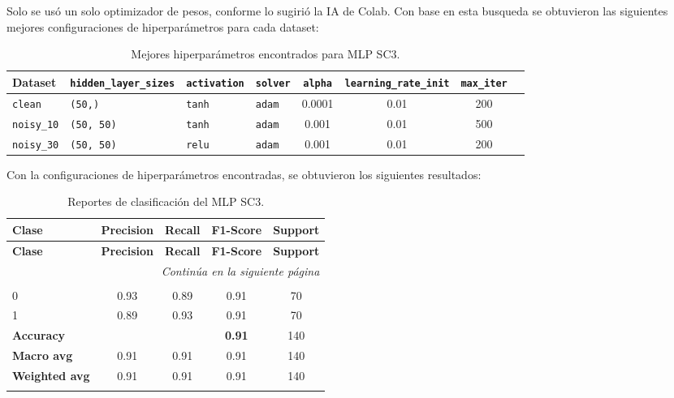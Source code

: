 \documentclass[12pt,a4paper]{article}
\begin{document}
\begin{enumerate}
   Solo se usó un solo optimizador de pesos, conforme lo sugirió la IA de Colab. Con base en esta busqueda se obtuvieron 
   las siguientes mejores configuraciones de hiperparámetros para cada dataset:

  \begin{table}[htbp]
    \centering\small
    \setlength{\tabcolsep}{4pt}
    \begin{tabularx}{\linewidth}{@{}l l l l c c c c@{}}
      \toprule
      \textbf{Dataset} & \texttt{hidden\_layer\_sizes} & \texttt{activation} & \texttt{solver} & \texttt{alpha} & \texttt{learning\_rate\_init} & \texttt{max\_iter}\\
      \midrule
      \texttt{clean}     & \texttt{(50,)}    & \texttt{tanh} & \texttt{adam} & 0.0001 & 0.01  & 200\\
      \texttt{noisy\_10} & \texttt{(50, 50)} & \texttt{tanh} & \texttt{adam} & 0.001  & 0.01  & 500\\
      \texttt{noisy\_30} & \texttt{(50, 50)} & \texttt{relu} & \texttt{adam} & 0.001  & 0.01  & 200\\
      \bottomrule
    \end{tabularx}
    \caption{Mejores hiperparámetros encontrados para MLP SC3.}
    \label{tab:best_hparams_mlp_sc3}
  \end{table}

   Con la configuraciones de hiperparámetros encontradas, se obtuvieron los siguientes resultados:

  \small
  \setlength{\tabcolsep}{4pt}
  \begin{longtable}{@{}lcccc@{}}
    \toprule
    \textbf{Clase} & \textbf{Precision} & \textbf{Recall} & \textbf{F1-Score} & \textbf{Support} \\
    \midrule
    \endfirsthead

    \toprule
    \textbf{Clase} & \textbf{Precision} & \textbf{Recall} & \textbf{F1-Score} & \textbf{Support} \\
    \midrule
    \endhead

    \midrule
    \multicolumn{5}{r}{\emph{Continúa en la siguiente página}} \\
    \endfoot

    \bottomrule
    \caption{Reportes de clasificación del MLP SC3.}
    \label{tab:reportes_clasificacion_mlp_sc3}
    \endlastfoot

    \multicolumn{5}{@{}l}{\textbf{(a) clean}}\\
    0 & 0.93 & 0.89 & 0.91 & 70 \\
    1 & 0.89 & 0.93 & 0.91 & 70 \\
    \midrule
    \multicolumn{3}{l}{\textbf{Accuracy}}     & \textbf{0.91} & 140 \\
    \textbf{Macro avg}    & 0.91 & 0.91 & 0.91 & 140 \\
    \textbf{Weighted avg} & 0.91 & 0.91 & 0.91 & 140 \\
    \addlinespace[0.8em]


\end{longtable}
\end{enumerate}
\end{document}
